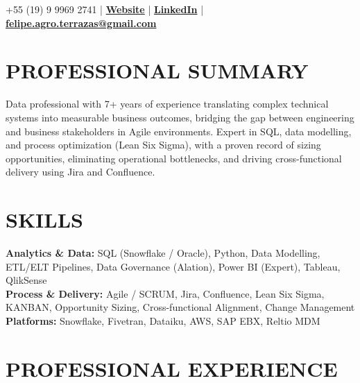 \documentclass[9pt, letterpaper]{article}
\begin{document}
	\pagestyle{empty}

	 \hfill +55 (19) 9 9969 2741 | \href{https://feliperamiresterrazas.github.io/professionalwebsite/}{\textbf{Website}} | \href{https://www.linkedin.com/in/felipe-ramires-terrazas/}{\textbf{LinkedIn}} |
	\\
	 \hfill \href{mailto:felipe.agro.terrazas@gmail.com}{\textbf{felipe.agro.terrazas@gmail.com}}

	\section*{PROFESSIONAL SUMMARY}
	\noindent Data professional with 7+ years of experience translating complex technical systems into measurable business outcomes, bridging the gap between engineering and business stakeholders in Agile environments. Expert in SQL, data modelling, and process optimization (Lean Six Sigma), with a proven record of sizing opportunities, eliminating operational bottlenecks, and driving cross-functional delivery using Jira and Confluence.

	\section*{SKILLS}
	\noindent \textbf{Analytics \& Data:} SQL (Snowflake / Oracle), Python, Data Modelling, ETL/ELT Pipelines, Data Governance (Alation), Power BI (Expert), Tableau, QlikSense \\
	\noindent \textbf{Process \& Delivery:} Agile / SCRUM, Jira, Confluence, Lean Six Sigma, KANBAN, Opportunity Sizing, Cross-functional Alignment, Change Management \\
	\noindent \textbf{Platforms:} Snowflake, Fivetran, Dataiku, AWS, SAP EBX, Reltio MDM


	\section*{PROFESSIONAL EXPERIENCE}
\end{document}
